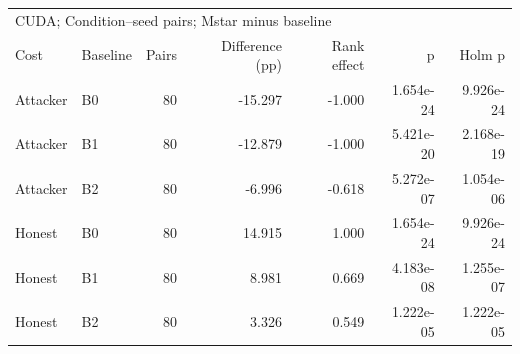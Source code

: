 \begin{tabular}{llrrrrr}
\toprule
\multicolumn{7}{l}{CUDA; Condition--seed pairs; Mstar minus baseline} \\
Cost & Baseline & Pairs & Difference (pp) & Rank effect & p & Holm p \\
\midrule
Attacker & B0 & 80 & -15.297 & -1.000 & 1.654e-24 & 9.926e-24 \\
Attacker & B1 & 80 & -12.879 & -1.000 & 5.421e-20 & 2.168e-19 \\
Attacker & B2 & 80 & -6.996 & -0.618 & 5.272e-07 & 1.054e-06 \\
Honest & B0 & 80 & 14.915 & 1.000 & 1.654e-24 & 9.926e-24 \\
Honest & B1 & 80 & 8.981 & 0.669 & 4.183e-08 & 1.255e-07 \\
Honest & B2 & 80 & 3.326 & 0.549 & 1.222e-05 & 1.222e-05 \\
\bottomrule
\end{tabular}
